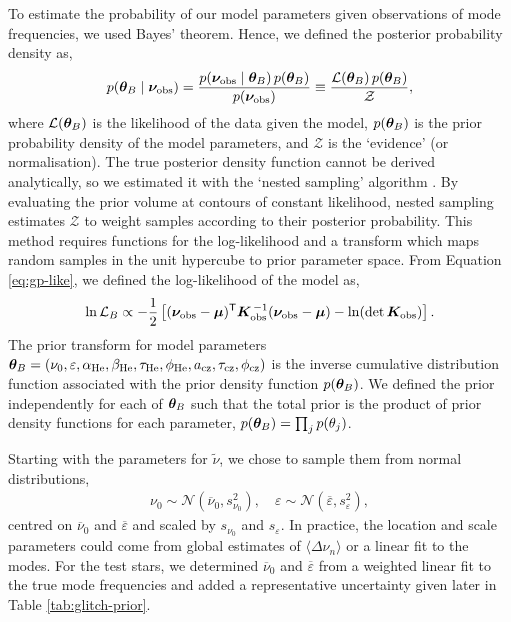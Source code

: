 To estimate the probability of our model parameters given observations of mode frequencies, we used Bayes' theorem. Hence, we defined the posterior probability density as, 
%
\begin{equation}
    p(\bm{\theta}_B \mid \bm{\nu}_{{\mathrm{obs}}}) = \frac{p(\bm{\nu}_{{\mathrm{obs}}} \mid \bm{\theta}_B)\,p(\bm{\theta}_B)}{p(\bm{\nu}_{{\mathrm{obs}}})} \equiv \frac{\mathcal{L}(\bm{\theta}_B)\,p(\bm{\theta}_B)}{\mathcal{Z}},
\end{equation}
%
where \(\mathcal{L}(\bm{\theta}_B)\) is the likelihood of the data given the model, \(p(\bm{\theta}_B)\) is the prior probability density of the model parameters, and \(\mathcal{Z}\) is the `evidence' (or normalisation). The true posterior density function cannot be derived analytically, so we estimated it with the `nested sampling' algorithm \citep{Skilling2004}. By evaluating the prior volume at contours of constant likelihood, nested sampling estimates \(\mathcal{Z}\) to weight samples according to their posterior probability. This method requires functions for the log-likelihood and a transform which maps random samples in the unit hypercube to prior parameter space. From Equation \ref{eq:gp-like}, we defined the log-likelihood of the model as,
%
\begin{equation}
    \ln\mathcal{L}_B \propto - \frac12 \left[ {(\bm{\nu}_{{\mathrm{obs}}} - \bm{\mu})^\mathsf{T} \bm{K}_{{\mathrm{obs}}}^{\,-1} (\bm{\nu}_{{\mathrm{obs}}} - \bm{\mu})} - \ln(\det \bm{K}_{{\mathrm{obs}}}) \right].
\end{equation}
%
The prior transform for model parameters \(\bm{\theta}_B = (\nu_0, \varepsilon, \alpha_{{\mathrm{He}}}, \beta_{{\mathrm{He}}}, \tau_{{\mathrm{He}}}, \phi_{{\mathrm{He}}}, a_{{\mathrm{cz}}}, \tau_{{\mathrm{cz}}}, \phi_{{\mathrm{cz}}})\) is the inverse cumulative distribution function associated with the prior density function \(p(\bm{\theta}_B)\). We defined the prior independently for each of \(\bm{\theta}_B\) such that the total prior is the product of prior density functions for each parameter, \(p(\bm{\theta}_B) = \prod_j p(\theta_{j})\).

Starting with the parameters for \(\tilde{\nu}\), we chose to sample them from normal distributions,
%
\begin{gather*}
    \nu_0 \sim \mathcal{N}(\overline{\nu}_0, s_{\nu_0}^2), \quad \varepsilon \sim \mathcal{N}(\overline{\varepsilon}, s_\varepsilon^2),%
\end{gather*}
%
centred on \(\overline{\nu}_0\) and \(\overline{\varepsilon}\) and scaled by \(s_{\nu_0}\) and \(s_\varepsilon\). In practice, the location and scale parameters could come from global estimates of \(\langle\Delta\nu_n\rangle\) or a linear fit to the modes. For the test stars, we determined \(\overline{\nu}_0\) and \(\overline{\varepsilon}\) from a weighted linear fit to the true mode frequencies and added a representative uncertainty given later in Table \ref{tab:glitch-prior}.

